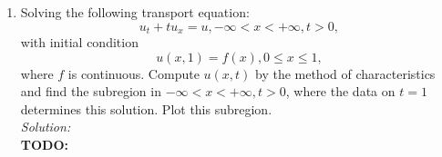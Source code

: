 \documentclass[10pt]{amsart}
\theoremstyle{nonumberplain}
\begin{document}
\begin{enumerate}[label={\bf {\arabic*}:}]
\begin{enumerate}
\item Solving the following transport equation:
$$
u_t + tu_x = u, -\infty < x < + \infty, t > 0,
$$
with initial condition
$$
u(x, 1) = f(x), 0 \leq x \leq 1,
$$
where $f$ is continuous.
Compute $u(x, t)$ by the method of characteristics and find the subregion in $-\infty < x < + \infty, t> 0$, where the data on $t = 1$ determines this solution.
Plot this subregion. \\

\noindent
\textit{Solution:} \\
\textbf{TODO: } \\


\end{enumerate}

\end{enumerate}
\end{document}
